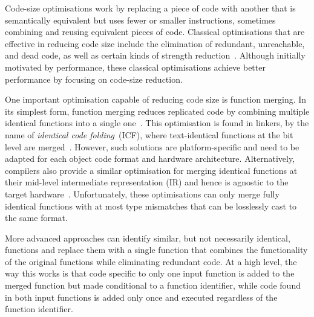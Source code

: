 Code-size optimisations work by replacing a piece of code with another that is semantically equivalent but uses fewer or smaller instructions, sometimes combining and reusing equivalent pieces of code.
Classical optimisations that are effective in reducing code size include the elimination of redundant, unreachable, and dead code, as well as certain kinds of strength reduction~\cite{cocke70,briggs97,debray00}.
Although initially motivated by performance, these classical optimisations achieve better performance by focusing on code-size reduction.

One important optimisation capable of reducing code size is function merging.
In its simplest form, function merging reduces replicated code by combining multiple identical functions into a single one~\cite{llvm-fm,livska14}.
This optimisation is found in linkers, by the name of \textit{identical code folding}~(ICF), where text-identical functions at the bit level are merged~\cite{tallam10,kwan12,msvc-icf}.
However, such solutions are platform-specific and need to be adapted for each object code format and hardware architecture.
Alternatively, compilers also provide a similar optimisation for merging identical functions at their mid-level intermediate representation (IR) and hence is agnostic to the target hardware~\cite{llvm-fm,livska14}.
Unfortunately, these optimisations can only merge fully identical functions with at most type mismatches that can be losslessly cast to the same format.

More advanced approaches can identify similar, but not necessarily identical, functions and replace them with a single function that combines the functionality of the original functions while eliminating redundant code.
At a high level, the way this works is that code specific to only one input function is added to the merged function but made conditional to a function identifier, while code found in both input functions is added only once and executed regardless of the function identifier.



